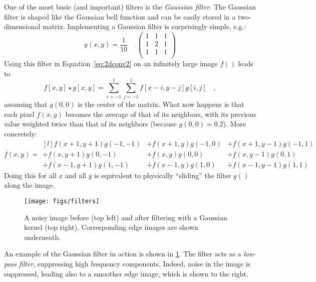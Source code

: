 One of the most basic (and important) filters is the \textsl{Gaussian filter}. The Gaussian filter is shaped like the Gaussian bell function and can be easily stored in a two-dimensional matrix. Implementing a Gaussian filter is surprisingly simple, e.g.:
\begin{equation}
g(x,y)=\frac{1}{10}\quad.
\left(
\begin{array}{ccc}
1 & 1 & 1\\
1 & 2 & 1\\
1 & 1 & 1\\
\end{array}
\right)
\end{equation}
Using this filter in Equation~\ref{eq:2dconv2} on an infinitely large image $f()$ leads to
\begin{equation}\label{eq:2dconv3}
f[x,y]\star g[x,y]=\sum_{i=-1}^{1}\sum_{j=-1}^{1}f[x-i,y-j]g[i,j]\quad,
\end{equation}
assuming that $g(0,0)$ is the center of the matrix. What now happens is that each pixel $f(x,y)$ becomes the average of that of its neighbors, with its previous value weighted twice than that of its neighbors (because $g(0,0)=0.2$). More concretely:
\begin{equation}
f(x,y)=
\begin{smallmatrix*}[l]
f(x+1,y+1)g(-1,-1) &+f(x+1,y)g(-1,0) &+f(x+1,y-1)g(-1,1)\\
+f(x,y+1)g(0,-1) &+f(x,y)g(0,0) &+f(x,y-1)g(0,1)\\
+f(x-1,y+1)g(1,-1) &+f(x-1,y)g(1,0) &+f(x-1,y-1)g(1,1)
\end{smallmatrix*}
\end{equation}
Doing this for all $x$ and all $y$ is equivalent to physically ``sliding'' the filter $g()$ along the image.

\begin{figure}[!]
    \centering
    \texttt{[image: figs/filters]}
    \caption{A noisy image before (top left) and after filtering with a Gaussian kernel (top right). Corresponding edge images are shown underneath.
    \label{fig:filters}}
\end{figure}

An example of the Gaussian filter in action is shown in \cref{fig:filters}. The filter acts as a \textsl{low-pass filter}, suppressing high frequency components. Indeed, noise in the image is suppressed, leading also to a smoother edge image, which is shown to the right.

